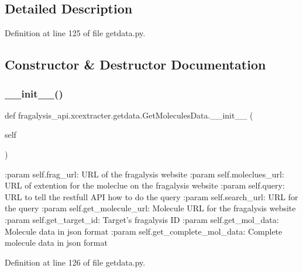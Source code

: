 \subsection{Detailed Description}


Definition at line 125 of file getdata.\+py.



\subsection{Constructor \& Destructor Documentation}
\mbox{\label{classfragalysis__api_1_1xcextracter_1_1getdata_1_1_get_molecules_data_a11e4a33bfbb0ff558ef33a0e8a46c76b}} 
\subsubsection{\texorpdfstring{\+\_\+\+\_\+init\+\_\+\+\_\+()}{\_\_init\_\_()}}
{\footnotesize\ttfamily def fragalysis\+\_\+api.\+xcextracter.\+getdata.\+Get\+Molecules\+Data.\+\_\+\+\_\+init\+\_\+\+\_\+ (\begin{DoxyParamCaption}\item[{}]{self }\end{DoxyParamCaption})}

\begin{DoxyVerb}:param self.frag_url: URL of the fragalysis website
:param self.moleclues_url: URL of extention for the moleclue on the fragalysis website
:param self.query: URL to tell the restfull API how to do the query
:param self.search_url: URL for the query 
:param self.get_molecule_url: Molecule URL for the fragalysis website
:param self.get_target_id: Target's fragalysis ID 
:param self.get_mol_data: Molecule data in json format
:param self.get_complete_mol_data: Complete molecule data in json format
\end{DoxyVerb}
 

Definition at line 126 of file getdata.\+py.


